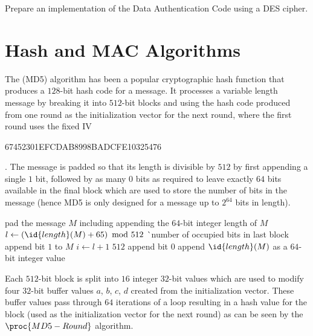 \begin{exercise}
Prepare an implementation of the Data Authentication Code using a DES cipher.
\end{exercise}



\section{Hash and MAC Algorithms}


The  (MD5) algorithm has been a popular cryptographic hash function
that produces a $128$-bit hash code for a message.
It processes a variable length message by breaking it into $512$-bit blocks and using the
hash code produced from one round as the initialization vector for the next round,
where the first round uses the fixed IV
\begin{code}67452301EFCDAB8998BADCFE10325476\end{code}.
The message is padded so that its length is divisible by $512$ by first appending a
single $1$ bit, followed by as many $0$ bits as required to leave exactly $64$ bits
available in the final block which are used to store the number of bits in the message
(hence MD5 is only designed for a message up to $2^{64}$ bits in length).
\begin{codebox}
\li \Comment pad the message $M$ including appending the $64$-bit integer length of $M$
\li $l \gets \left(\id{length}(M)+65\right)\mbox{ mod }512$
   \`\Comment number of occupied bits in last block
\li append bit $1$ to $M$
\li \For $i\gets l+1$ \To $512$ \Do
\li    append bit $0$
    \End
\li append $\id{length}(M)$ as a $64$-bit integer value
\end{codebox}
Each $512$-bit block is split into $16$ integer $32$-bit values which are used to modify
four $32$-bit buffer values $a$, $b$, $c$, $d$ created from the initialization vector.
These buffer values pass through $64$ iterations of a loop resulting in a hash value for
the block (used as the initialization vector for the next round) as can be seen by the
$\proc{MD5-Round}$ algorithm.
